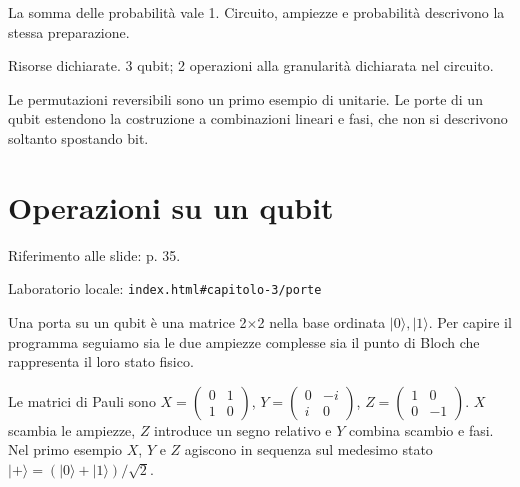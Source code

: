 
La somma delle probabilità vale 1. Circuito, ampiezze e probabilità descrivono la stessa preparazione.\par


Risorse dichiarate. 3 qubit; 2 operazioni alla granularità dichiarata nel circuito.\par


Le permutazioni reversibili sono un primo esempio di unitarie. Le porte di un qubit estendono la costruzione a combinazioni lineari e fasi, che non si descrivono soltanto spostando bit.\par



\Needspace{.43\textheight}
\section{Operazioni su un qubit}
\label{c3-porte}

{\sffamily\small\color{Ink!70} Riferimento alle slide: p. 35.\par}

{\sffamily\small\color{Ink!70} Laboratorio locale: \nolinkurl{index.html#capitolo-3/porte}\par}

Una porta su un qubit è una matrice 2\(\times\)2 nella base ordinata \(|0\rangle ,\allowbreak |1\rangle \). Per capire il programma seguiamo sia le due ampiezze complesse sia il punto di Bloch che rappresenta il loro stato fisico.\par

Le matrici di Pauli sono \(X=\)\(\begin{pmatrix}0&1\\1&0\end{pmatrix}\), \(Y=\)\(\begin{pmatrix}0&- i\\i&0\end{pmatrix}\), \(Z=\)\(\begin{pmatrix}1&0\\0&- 1\end{pmatrix}\). \(X\) scambia le ampiezze, \(Z\) introduce un segno relativo e \(Y\) combina scambio e fasi. Nel primo esempio \(X\), \(Y\) e \(Z\) agiscono in sequenza sul medesimo stato \(|+\rangle =(|0\rangle +|1\rangle )/\sqrt{2}\).\par

